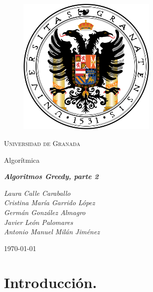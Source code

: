 \documentclass[11pt,a4paper]{article}
\begin{document}
	\begin{titlepage}

		\centering

		\begin{figure}[h]

			\centering
			\includegraphics[width=0.6\textwidth]{logo-ugr.png}
			
		\end{figure}

		\vspace{1cm}

		{\scshape\LARGE Universidad de Granada}

		\vspace{1cm}

		{\LARGE Algorítmica}

		\vspace{1cm}

		{\huge\bfseries\textit{Algoritmos Greedy, parte 2}}

		\vspace{1cm}

		{\itshape\large 
		Laura Calle Caraballo \\
		Cristina María Garrido López \\
		Germán González Almagro \\
		Javier León Palomares \\
		Antonio Manuel Milán Jiménez}

		\vfill

		{\Large\today}

	\end{titlepage}

\newpage

	\tableofcontents

\newpage

	\section{Introducción.}
\end{document}
